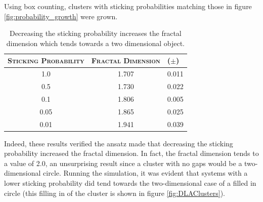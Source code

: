 \documentclass[%
 aapm,
 mph,%
 amsmath,amssymb,
 reprint,%
]{revtex4-2}
\begin{document}
Using box counting, clusters with sticking probabilities matching those in figure \ref{fig:probability_growth} were grown.
\begin{table}[h]
\caption{\label{tab:sticking_probabilities}Decreasing the sticking probability increases the fractal dimension which tends towards a two dimensional object.}
\begin{ruledtabular}
\begin{tabular}{lcr}
\textsc{Sticking Probability}      & \multicolumn{1}{l}{\textsc{Fractal Dimension}} & \multicolumn{1}{l}{($\pm$)} \\ \hline
\multicolumn{1}{c|}{1.0}  & 1.707                                 & 0.011                       \\
\multicolumn{1}{c|}{0.5}  & 1.730                                 & 0.022                       \\
\multicolumn{1}{c|}{0.1}  & 1.806                                 & 0.005                       \\
\multicolumn{1}{c|}{0.05} & 1.865                                 & 0.025                       \\
\multicolumn{1}{c|}{0.01} & 1.941                                 & 0.039                      
\end{tabular}
\end{ruledtabular}
\end{table}
Indeed, these results verified the ansatz made that decreasing the sticking probability increased the fractal dimension. In fact, the fractal dimension tends to a value of 2.0, an unsurprising result since a cluster with no gaps would be a two-dimensional circle. Running the simulation, it was evident that systems with a lower sticking probability did tend towards the two-dimensional case of a filled in circle (this filling in of the cluster is shown in figure \ref{fig:DLAClusters}).
\end{document}
